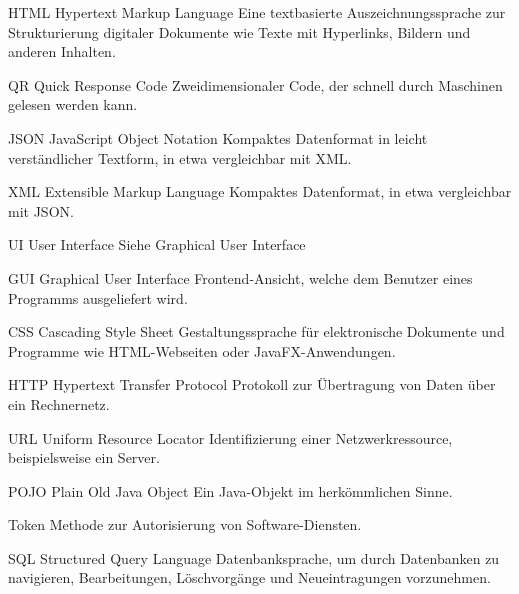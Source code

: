   {HTML}            %
  {Hypertext Markup Language}  %
  {Eine textbasierte Auszeichnungssprache zur Strukturierung digitaler Dokumente wie Texte mit Hyperlinks, Bildern und anderen Inhalten.} %
  
  {QR}            %
  {Quick Response Code}  %
  {Zweidimensionaler Code, der schnell durch Maschinen gelesen werden kann.} %
  
  {JSON}            %
  { JavaScript Object Notation}  %
  {Kompaktes Datenformat in leicht verständlicher Textform, in etwa vergleichbar mit XML.} %

  {XML}            %
  { Extensible Markup Language}  %
  {Kompaktes Datenformat, in etwa vergleichbar mit JSON.} %
  
  {UI}            %
  { User Interface}  %
  {Siehe Graphical User Interface} %

  {GUI}            %
  { Graphical User Interface}  %
  {Frontend-Ansicht, welche dem Benutzer eines Programms ausgeliefert wird.} %

  {CSS}            %
  { Cascading Style Sheet}  %
  {Gestaltungssprache für elektronische Dokumente und Programme wie HTML-Webseiten oder JavaFX-Anwendungen.} %

  {HTTP}            %
  { Hypertext Transfer Protocol}  %
  {Protokoll zur Übertragung von Daten über ein Rechnernetz.} %

  {URL}            %
  { Uniform Resource Locator}  %
  {Identifizierung einer Netzwerkressource, beispielsweise ein Server.} %
  
  {POJO}            %
  { Plain Old Java Object}  %
  {Ein Java-Objekt im herkömmlichen Sinne.} %
  
  {Token}            %
  {Methode zur Autorisierung von Software-Diensten.} %
  
  {SQL}            %
  { Structured Query Language}  %
  {Datenbanksprache, um durch Datenbanken zu navigieren, Bearbeitungen, Löschvorgänge und Neueintragungen vorzunehmen.} %
  
